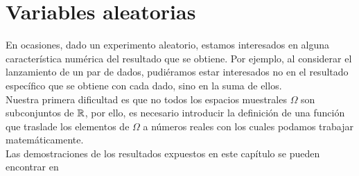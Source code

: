 \section{Variables aleatorias}
En ocasiones, dado un experimento aleatorio, estamos interesados en alguna característica numérica del resultado que se obtiene. Por ejemplo, al considerar el lanzamiento de un par de dados, pudiéramos estar interesados no en el resultado específico que se obtiene con cada dado, sino en la suma de ellos.\\
Nuestra primera dificultad es que no todos los espacios muestrales $\Omega$ son subconjuntos de ${\mathbb{R}}$, por ello, es necesario introducir la definición de una función que traslade los elementos de $\Omega$ a números reales con los cuales podamos trabajar matemáticamente.\\
Las demostraciones de los resultados expuestos en este capítulo se pueden encontrar en 
\\\\
\begin{comment}
\begin{Def}
El $\sigma-$álgebra de Borel en $\R$ denotado por $\mathscr{B}(\R)$ es
$$\mathscr{B}(\R)=\sigma(\{(a,\thinspace b)\subset\R:a\leq b\})$$
\end{Def}
\begin{Prop}
\textbf{ }\\
\begin{enumerate}
    \item Todo intervalo de $\R$ es un booreliano.
    \item Los subconjuntos cerrados y abiertos de $\R$ son borelianos
\end{enumerate}
\end{Prop}
\begin{Def}
Una función $\phi:\R^n\rightarrow\R^m$ es llamada boreliana si $\phi^{-1}(B)$ es un conjunto boreliano de $R^{-1}$ para todo boreliano B de $\R$.
\end{Def}
Recuérdese que si $\phi:\R^n\rightarrow\R^m$ es cualquier función, se cumple que $\phi^{-1}(B^c)=[\phi^{-1}(B)]^c$
 $\phi^{-1}(\bigcup_{\lambda}B_{\lambda})=\bigcup_{\lambda}\phi^{-1}(B_\lambda)$. Esto
implica que $\{B\subset \R^m: \phi^{-1}(B)\in B(\R^n)\}$ es un $\sigma$-álgebra de subconjuntos de $R^m$ , de manera que, para demostrar que una
cierta función f es boreliana, basta con probar que $\phi^{-1}(B)$ es un conjunto boreliano de $\R^n$ para cualquier elemento B abierto (o cualquier elemento B de una familia de generadores de los borelianos de $\R^m$).
Con base de esta idea, se pueden demostrar las siguientes proposiciones.
\begin{Prop}
$\phi:\R^n\rightarrow\R^m$,  $g:\R^m\rightarrow\R^p$ son borelianos, entonces $g\circ\phi$ es boreliano
\end{Prop}
\begin{Prop} Si $\phi:\R^n\rightarrow\R^m$ es continua, entonces es boreliana.
\end{Prop}
\end{comment}
